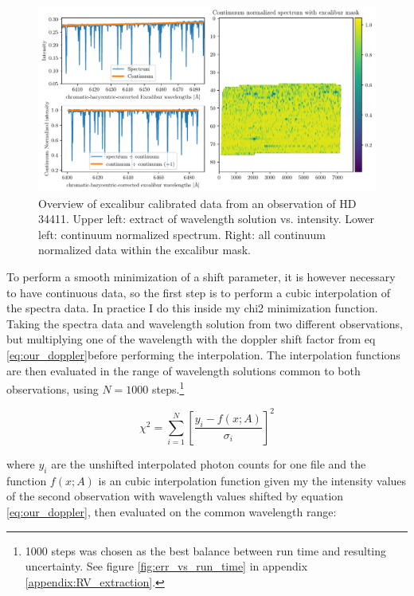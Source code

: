     \begin{figure}%
        \begin{wide}  
            \includegraphics[width=\textwidth]{figures/rv_data_overview.pdf}
            \caption{Overview of excalibur calibrated data from an observation of HD 34411. Upper left: extract of wavelength solution vs. intensity. Lower left: continuum normalized spectrum. Right: all continuum normalized data within the excalibur mask.}
            \label{fig:rv_data_overview}
        \end{wide}
    \end{figure}
            
    To perform a smooth minimization of a shift parameter, it is however necessary to have continuous data, so the first step is to perform a cubic interpolation of the spectra data. In practice I do this inside my chi2 minimization function. Taking the spectra data and wavelength solution from two different observations, but multiplying one of the wavelength with the doppler shift factor from eq \ref{eq:our_doppler}before performing the interpolation. The interpolation functions are then evaluated in the range of wavelength solutions common to both observations, using $N=1000$ steps.\footnote{1000 steps was chosen as the best balance between run time and resulting uncertainty. See figure \ref{fig:err_vs_run_time} in appendix \ref{appendix:RV_extraction}. } 
    
    \begin{equation}
        \label{eq:shift_fit_chi2}
        \chi^{2}=\sum_{i=1}^{N}\left[\frac{y_{i}-f(x; A)}{\sigma_{i}}\right]^{2}
    \end{equation}
    
    where $y_i$ are the unshifted interpolated photon counts for one file and the function $f(x; A)$ is an cubic interpolation function given my the intensity values of the second observation with wavelength values shifted by equation \ref*{eq:our_doppler}, then evaluated on the common wavelength range:
    
